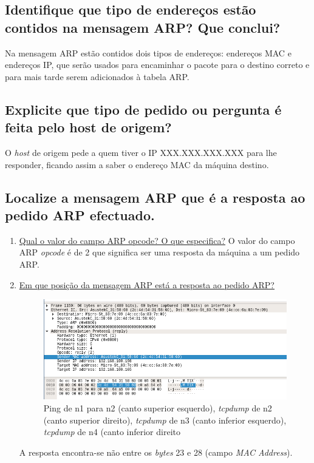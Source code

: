 \documentclass[a4paper]{article}
\begin{document}
\subsection{Identifique  que  tipo  de  endereços  estão  contidos  na  mensagem  ARP? Que conclui?}
Na mensagem ARP estão contidos dois tipos de endereços: endereços MAC e endereços IP, que serão usados para encaminhar o pacote para o destino correto e para mais tarde serem adicionados à tabela ARP.


\subsection{Explicite que tipo de pedido ou pergunta é feita pelo host de origem?}
O \textit{host} de origem pede a quem tiver o IP XXX.XXX.XXX.XXX para lhe responder, ficando assim a saber o  endereço MAC da máquina destino.


\subsection{Localize a mensagem ARP que é a resposta ao pedido ARP efectuado.}

\begin{enumerate}
    \item \underline{Qual o valor do campo ARP opcode? O que especifica?}\newline\newline
    O valor do campo ARP \textit{opcode} é de 2 que significa ser uma resposta da máquina a um pedido ARP.\newline
    \item \underline{Em que posição da mensagem ARP está a resposta ao pedido ARP?}\newline\newline
    \begin{figure}[H]
    \centering
    \includegraphics[scale=0.40]{pics/p15-1.png}
    \caption{Ping de n1 para n2 (canto superior esquerdo), \textit{tcpdump} de n2 (canto superior direito), \textit{tcpdump} de n3 (canto inferior esquerdo), \textit{tcpdump} de n4 (canto inferior direito}
    \end{figure}
    A resposta encontra-se não entre os \textit{bytes} 23 e 28 (campo \textit{MAC Address}).
\end{enumerate}
\end{document}
